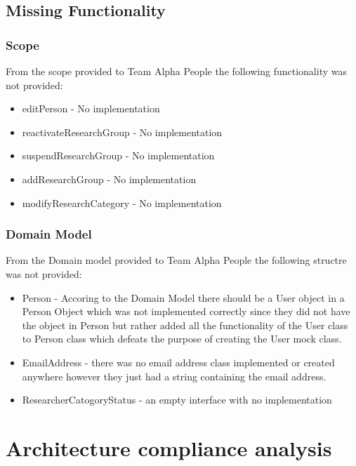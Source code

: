 \documentclass{article}
\begin{document}
    \subsection{Missing Functionality}
	\subsubsection{Scope}
	From the scope provided to Team Alpha People the following functionality was not provided:
	\begin{itemize}
		\item editPerson - No implementation
		\item reactivateResearchGroup - No implementation
		\item suspendResearchGroup - No implementation
		\item addResearchGroup - No implementation
		\item modifyResearchCategory - No implementation
	\end{itemize}
	
	\subsubsection{Domain Model}
	From the Domain model provided to Team Alpha People the following structre was not provided:
	\begin{itemize}
		\item Person - Accoring to the Domain Model there should be a User object in a Person Object which was not implemented correctly since they did not have the object in Person but rather added all the functionality of the User class to Person class which defeats the purpose of creating the User mock class.
		\item EmailAddress - there was no email address class implemented or created anywhere however they just had a string containing the email address.
		\item ResearcherCatogoryStatus - an empty interface with no implementation
	 \end{itemize}
	 
      
    
    
    


\section{Architecture compliance analysis}
\end{document}
